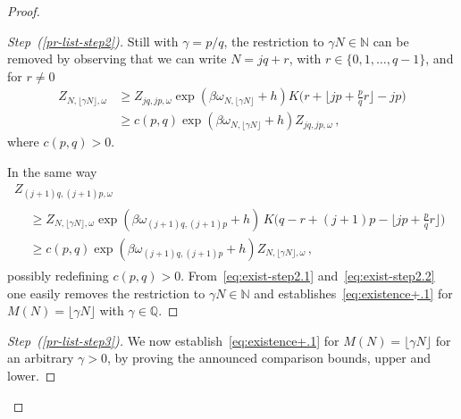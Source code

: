 \documentclass[11pt]{article}
\theoremstyle{definition}
\numberwithin{equation}{section}
\numberwithin{figure}{section}
\numberwithin{table}{section}
\newenvironment{step}[1]{\begin{proof}[#1]}{\let\qed\relax\end{proof}}
\newcommand{\gb}{\beta}
\newcommand{\go}{\omega}
\newcommand{\bbN}{\ensuremath{\mathbb{N}}}
\newcommand{\bbQ}{\ensuremath{\mathbb{Q}}}
\begin{document}
\begin{proof}
\begin{step}{Step~(\ref{pr-list-step2})}
Still with $\gamma =p/q$, the restriction to $\gamma N \in \bbN$ can be removed by observing that we can write $N= jq+r$, with $r\in \{0, 1, \ldots, q-1\}$, and for $r\neq 0$
\begin{equation}\label{eq:exist-step2.1}
\begin{split}
Z_{N, \lfloor \gamma N \rfloor, \go} &\ge Z_{jq, jp, \go} \exp(\gb \go_{N, \lfloor \gamma N \rfloor}+h) K \Big(r+ \Big \lfloor jp+ \frac{p}{q} r \Big \rfloor -jp \Big)
\\ & \ge c(p,q) \exp(\gb \go_{N, \lfloor \gamma N \rfloor}+h) Z_{jq, jp, \go}\,,
\end{split}
\end{equation}
where $c(p,q)>0$.

In the same way
\begin{multline}\label{eq:exist-step2.2}
Z_{(j+1)q, (j+1)p, \go}\\
\begin{aligned}
&\ge Z_{N, \lfloor \gamma N \rfloor, \go} \exp(\gb \go_{(j+1)q, (j+1)p}+h)\,K \Big(q-r+ (j+1)p- \Big \lfloor jp+ \frac{p}{q} r \Big \rfloor\!\Big)\\
&\ge c(p,q) \exp(\gb \go_{(j+1)q, (j+1)p}+h) Z_{N, \lfloor \gamma N \rfloor, \go}\,,
\end{aligned}
\end{multline}
possibly redefining $c(p,q)>0$. From~\eqref{eq:exist-step2.1} and~\eqref{eq:exist-step2.2} one easily removes the restriction to $\gamma N \in \bbN$ and establishes~\eqref{eq:existence+.1} for $M(N) = \lfloor \gamma N \rfloor$ with $\gamma\in \bbQ$.
\end{step}

\begin{step}{Step~(\ref{pr-list-step3})}
We now establish~\eqref{eq:existence+.1} for $M(N)= \lfloor \gamma N\rfloor$ for an arbitrary $\gamma>0$, by proving the announced comparison bounds, upper and lower.


\end{step}
\end{proof}
\end{document}
